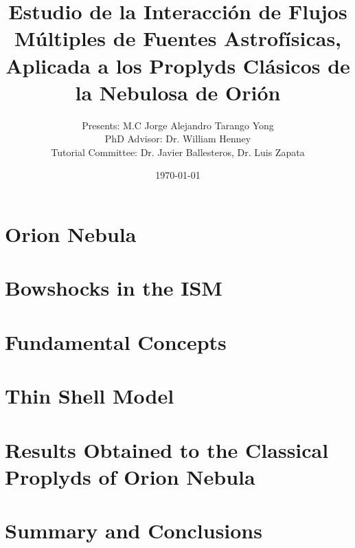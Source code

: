 \documentclass{beamer}
\title[PhD Thesis]{Estudio de la Interacción de Flujos Múltiples de Fuentes Astrofísicas, Aplicada a los Proplyds Clásicos de la Nebulosa de Orión}
\author[M.C Jorge Alejandro Tarango Yong]{Presents: M.C Jorge Alejandro Tarango Yong \\
  PhD Advisor: Dr. William Henney \\
  Tutorial Committee: Dr. Javier Ballesteros, Dr. Luis Zapata}
\date{\today}
\begin{document}


\section{Orion Nebula}
\section{Bowshocks in the ISM}
\section{Fundamental Concepts}
\section{Thin Shell Model}
\section{Results Obtained to the Classical Proplyds of Orion Nebula}
\section{Summary and Conclusions}
\end{document}
